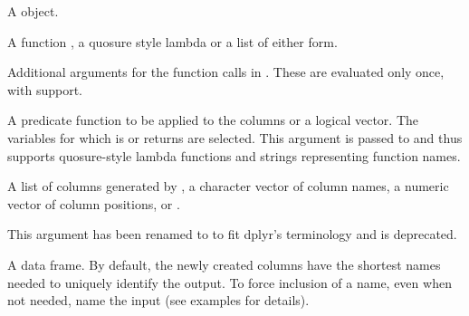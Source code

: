 \documentclass[a4paper]{book}
\begin{document}
\begin{Arguments}
\begin{ldescription}
\item[\code{.tbl}] A  object.

\item[\code{.funs}] A function , a quosure style lambda  or a list of either form.

\item[\code{...}] Additional arguments for the function calls in
. These are evaluated only once, with  support.

\item[\code{.predicate}] A predicate function to be applied to the columns
or a logical vector. The variables for which  is or
returns  are selected. This argument is passed to
 and thus supports quosure-style lambda
functions and strings representing function names.

\item[\code{.vars}] A list of columns generated by ,
a character vector of column names, a numeric vector of column
positions, or .

\item[\code{.cols}] This argument has been renamed to  to fit
dplyr's terminology and is deprecated.
\end{ldescription}
\end{Arguments}
%
\begin{Value}
A data frame. By default, the newly created columns have the shortest
names needed to uniquely identify the output. To force inclusion of a name,
even when not needed, name the input (see examples for details).
\end{Value}
%
\end{document}
